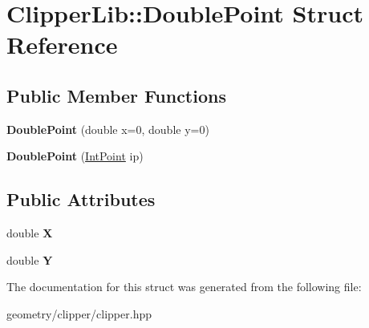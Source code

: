 \hypertarget{struct_clipper_lib_1_1_double_point}{}\section{Clipper\+Lib\+:\+:Double\+Point Struct Reference}
\label{struct_clipper_lib_1_1_double_point}
\subsection*{Public Member Functions}
\begin{DoxyCompactItemize}
\item 
\mbox{\label{struct_clipper_lib_1_1_double_point_a3ccbea6aaf488e0a2d8ac499d2676093}} 
{\bfseries Double\+Point} (double x=0, double y=0)
\item 
\mbox{\label{struct_clipper_lib_1_1_double_point_afd33c9193b3cf11536936dc933b965a4}} 
{\bfseries Double\+Point} (\mbox{\hyperlink{struct_clipper_lib_1_1_int_point}{Int\+Point}} ip)
\end{DoxyCompactItemize}
\subsection*{Public Attributes}
\begin{DoxyCompactItemize}
\item 
\mbox{\label{struct_clipper_lib_1_1_double_point_a675837cc05f20447313789b82d84ad31}} 
double {\bfseries X}
\item 
\mbox{\label{struct_clipper_lib_1_1_double_point_a49774a93540882d88448badf37034454}} 
double {\bfseries Y}
\end{DoxyCompactItemize}


The documentation for this struct was generated from the following file\+:\begin{DoxyCompactItemize}
\item 
geometry/clipper/clipper.\+hpp\end{DoxyCompactItemize}
